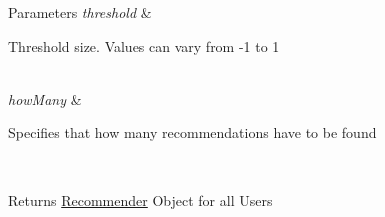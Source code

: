 \begin{DoxyParams}{Parameters}
{\em threshold} & 
\begin{DoxyItemize}
\item Threshold size. Values can vary from -\/1 to 1 
\end{DoxyItemize}\\
\hline
{\em how\+Many} & 
\begin{DoxyItemize}
\item Specifies that how many recommendations have to be found
\end{DoxyItemize}\\
\hline
\end{DoxyParams}
\begin{DoxyReturn}{Returns}
\hyperlink{class_recommender}{Recommender} Object for all Users 
\end{DoxyReturn}
